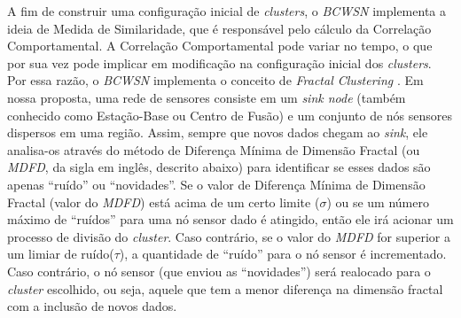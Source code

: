 \documentclass{acm_proc_article-sp}
\begin{document}
A fim de construir uma configuração inicial de {\it clusters}, o {\it BCWSN}
implementa a ideia de Medida de Similaridade, que é responsável pelo cálculo da
Correlação Comportamental. A Correlação Comportamental pode variar no tempo, o
que por sua vez pode implicar em modificação na configuração inicial dos {\it
clusters}.
Por essa razão, o {\it BCWSN} implementa o conceito de {\it Fractal Clustering}
\cite{Barbara2000}. Em nossa proposta, uma rede de sensores consiste em um {\it
sink node} (também conhecido como Estação-Base ou Centro de Fusão) e um conjunto
de nós sensores dispersos em uma região.
Assim, sempre que novos dados chegam ao {\it sink}, ele analisa-os através do
método de Diferença Mínima de Dimensão Fractal (ou {\it MDFD}, da sigla em
inglês, descrito abaixo) para identificar se esses dados são apenas ``ruído'' ou
``novidades''.
Se o valor de Diferença Mínima de Dimensão Fractal (valor do {\it MDFD}) está
acima de um certo limite ($\sigma$) ou se um número máximo de ``ruídos'' para
uma nó sensor dado é atingido, então ele irá acionar um processo de divisão do
{\it cluster}. Caso contrário, se o valor do {\it MDFD} for superior a um limiar
de ruído($\tau$), a quantidade de ``ruído'' para o nó sensor é incrementado.
Caso contrário, o nó sensor (que enviou as ``novidades'') será realocado para o
{\it cluster} escolhido, ou seja, aquele que tem a menor diferença na dimensão
fractal com a inclusão de novos dados.
\vspace*{-.3cm}
\end{document}

